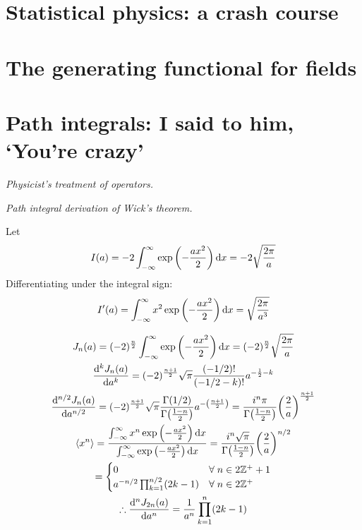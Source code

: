\documentclass{report}
\begin{document}
\chapter{Statistical physics: a crash course}

\chapter{The generating functional for fields}

\chapter{Path integrals: I said to him, `You're crazy'}

\begin{subquests}
	\item \emph{Physicist's treatment of operators.}

	\item \emph{Path integral derivation of Wick's theorem.}
	\begin{subquests}
		\item Let
		\begin{gather*}
			I(a) = -2\int_{-\infty}^{\infty}\exp\pqty{-\frac{ax^2}{2}} \dd{x} = -2\sqrt{\frac{2\pi}{a}}
		\end{gather*}
		Differentiating under the integral sign:
		\begin{gather*}
			I'(a) = \int_{-\infty}^{\infty}x^2\exp\pqty{-\frac{ax^2}{2}} \dd{x} = \sqrt{\frac{2\pi}{a^3}}
		\end{gather*}

		\item 
		\begin{gather*}
			J_n(a) = (-2)^\frac{n}{2} \int_{-\infty}^{\infty}\exp\pqty{-\frac{ax^2}{2}} \dd{x} = (-2)^{\frac{n}{2}}\sqrt{\frac{2\pi}{a}} \\
			\dv[k]{J_n(a)}{a} = (-2)^{\frac{n+1}{2}}\sqrt{\pi}\frac{(-1/2)!}{(-1/2-k)!}a^{-\frac{1}{2}-k} \\
			\dv[n/2]{J_n(a)}{a} = (-2)^{\frac{n+1}{2}}\sqrt{\pi}\frac{\Gamma(1/2)}{\Gamma\pqty{\frac{1-n}{2}}} a^{-\pqty{\frac{n+1}{2}}} = \frac{i^n \pi}{\Gamma\pqty{\frac{1-n}{2}}}\pqty{\frac{2}{a}}^{\frac{n+1}{2}} \\
			\expval{x^n} = \frac{\int_{-\infty}^{\infty}x^n\exp\pqty{-\frac{ax^2}{2}} \dd{x}}{\int_{-\infty}^{\infty}\exp\pqty{-\frac{ax^2}{2}} \dd{x}} = \frac{i^n \sqrt{\pi}}{\Gamma\pqty{\frac{1-n}{2}}}\pqty{\frac{2}{a}}^{n/2} \\
			= \begin{cases} 0 & \forall\;n \in 2\mathbb{Z^+} + 1 \\ a^{-n/2}\prod_{k = 1}^{n/2}(2k-1) & \forall\;n \in 2\mathbb{Z^+} \end{cases} \\
			\therefore \dv[n]{J_{2n}(a)}{a} = \frac{1}{a^n}\prod_{k=1}^{n}(2k-1)
		\end{gather*}
	\end{subquests}
\end{subquests}
\end{document}
